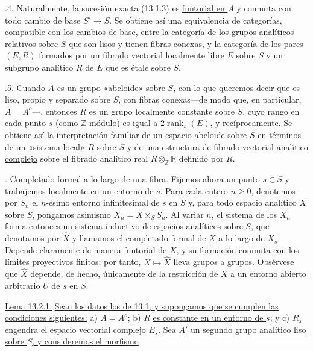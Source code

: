 \medskip
{}.4. Naturalmente, la sucesión exacta (13.1.3) es
\underline{funtorial en $A$} y conmuta con todo cambio de base
$S'\longrightarrow S$. Se obtiene así una equivalencia de categorías,
compatible con los cambios de base, entre la categoría de los grupos
analíticos relativos sobre $S$ que son lisos y tienen fibras conexas, y
la categoría de los pares $(E,R)$ formados por un fibrado vectorial
localmente libre $E$ sobre $S$ y un subgrupo analítico $R$ de $E$ que es
étale sobre $S$.


\medskip
{}.5. Cuando $A$ es un grupo «\underline{abeloide}» sobre $S$, con lo
que queremos decir que es liso, propio y separado sobre $S$, con fibras
conexas---de modo que, en particular, $A=A^o$---, entonces $R$ es un
grupo localmente constante sobre $S$, cuyo rango en cada punto $s$ (como
$\mathbb Z$-módulo) es igual a $2\operatorname{rank}_s(E)$, y
recíprocamente. Se obtiene así la interpretación familiar de un espacio
abeloide sobre $S$ en términos de un «\underline{sistema local}» $R$
sobre $S$ y de una estructura de fibrado vectorial analítico
\underline{complejo} sobre el fibrado analítico real
$R\otimes_{\mathbb Z}\mathbb R$ definido por $R$.

\medskip
{}. \underline{Completado formal a lo largo de una fibra.} Fijemos
ahora un punto $s\in S$ y trabajemos localmente en un entorno de $s$.
Para cada entero $n\geqslant0$, denotemos por $S_n$ el $n$-ésimo entorno
infinitesimal de $s$ en $S$ y, para todo espacio analítico $X$ sobre
$S$, pongamos asimismo $X_n=X\times_S S_n$. Al variar $n$, el sistema de
los $X_n$ forma entonces un sistema inductivo de espacios analíticos
sobre $S$, que denotamos por $\widehat X$ y llamamos el
\underline{completado formal de $X$ a lo largo de $X_s$}. Depende
claramente de manera funtorial de $X$, y su formación conmuta con los
límites proyectivos finitos; por tanto, $X\longmapsto\widehat X$ lleva
grupos a grupos. Obsérvese que $\widehat X$ depende, de hecho, únicamente
de la restricción de $X$ a un entorno abierto arbitrario $U$ de $s$ en
$S$.


\medskip
\noindent
\underline{Lema 13.2.1.} \underline{Sean los datos los de 13.1, y
supongamos que se cumplen las condiciones siguientes:} a) $A=A^o$;
b) $R$ \underline{es constante en un entorno de $s$}; y c) $R_s$
\underline{engendra el espacio vectorial complejo $E_s$}.
\underline{Sea $A'$ un segundo grupo analítico liso sobre $S$, y
consideremos el morfismo}

